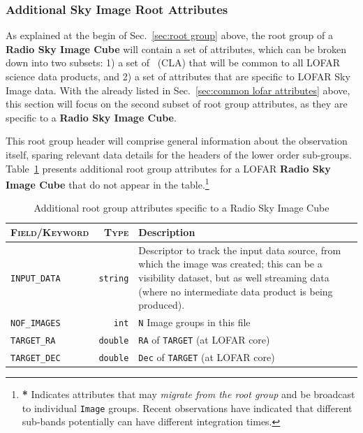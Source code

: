 \documentclass[a4paper,10pt,bibtotoc]{scrartcl}
\begin{document}
\subsubsection{Additional Sky Image Root Attributes}
\label{sec:additional root group attributes}

As explained at the begin of Sec.~\ref{sec:root group} above, the root group of
a \textbf{Radio Sky Image Cube} will contain a set of attributes, which can
be broken down into two subsets: 1) a set of \cla\ (CLA) that will be common to all
LOFAR science data products, and 2) a set of attributes that are specific to LOFAR
Sky Image data. With the {\cla} already listed in Sec.~\ref{sec:common lofar attributes}
above, this section will focus on the second subset of root
group attributes, as they are specific to a \textbf{Radio Sky Image Cube}.

This root group header will comprise general information about the
observation itself, sparing relevant data details for the headers of
the lower order sub-groups.  Table~\ref{tab:attributes root group}
presents additional root group attributes for a LOFAR \textbf{Radio Sky Image Cube}
that do not appear in the {\cla} table.\footnote{\textbf{ *} Indicates attributes that may
  \textit{migrate from the root group} and be broadcast to individual
  \texttt{Image} groups.  Recent observations have indicated that
  different sub-bands potentially can have different integration
  times.}

\begin{table}[htbp]
  \centering
  \begin{tabular}{|lrp{10cm}|}
    \hline
    \textsc{Field/Keyword} & \textsc{Type} & \sc Description \\
    \hline \hline
    \small\verb|INPUT_DATA| & \texttt{string} & Descriptor to
    track the input data source, from which the image was created;
    this can be a visibility dataset, but as well streaming data
    (where no intermediate data product is being produced). \\
    \small\verb|NOF_IMAGES| & \small\verb|int| &
    \small{\texttt{N}} Image groups in this file \\
    \small\verb|TARGET_RA| & \small\verb|double| &
    \small\verb|RA| of \small\verb|TARGET| (at LOFAR core) \\
    \small\verb|TARGET_DEC| & \small\verb|double| &
    \small\verb|Dec| of \small\verb|TARGET| (at LOFAR core) \\
    \hline
  \end{tabular}
  \caption{Additional root group attributes specific to a Radio Sky Image Cube}
  \label{tab:attributes root group}
\end{table}
\end{document}
